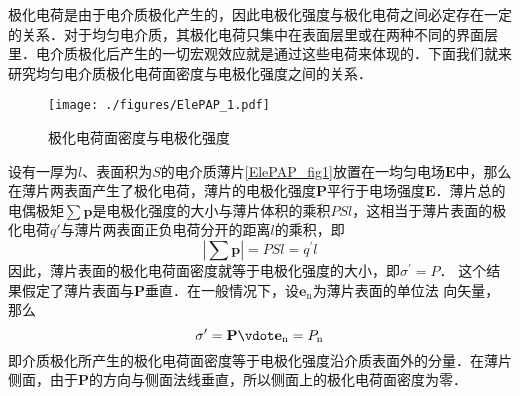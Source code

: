 

极化电荷是由于电介质极化产生的，因此电极化强度与极化电荷之间必定存在一定的关系．对于均匀电介质，其极化电荷只集中在表面层里或在两种不同的界面层里．电介质极化后产生的一切宏观效应就是通过这些电荷来体现的．下面我们就来研究均匀电介质极化电荷面密度与电极化强度之间的关系．

\begin{figure}[ht]
\centering
\texttt{[image: ./figures/ElePAP\_1.pdf]}
\caption{极化电荷面密度与电极化强度} \label{ElePAP_fig1}
\end{figure}
设有一厚为$l$、表面积为$S $的电介质薄片\autoref{ElePAP_fig1}放置在一均匀电场$\mathbf E $中，那么在薄片两表面产生了极化电荷，薄片的电极化强度$\mathbf P $平行于电场强度$\mathbf E$．薄片总的电偶极矩$\sum \mathbf p$是电极化强度的大小与薄片体积的乘积$PSl$，这相当于薄片表面的极化电荷$q' $与薄片两表面正负电荷分开的距离$l $的乘积，即
\begin{equation}
\left|\sum \mathbf p\right|=P S l=q^{\prime} l
\end{equation}
因此，薄片表面的极化电荷面密度就等于电极化强度的大小，即$\sigma^{\prime}=P$．
这个结果假定了薄片表面与$\mathbf P $垂直．在一般情况下，设$\mathbf e_\mathrm{n} $为薄片表面的单位法
向矢量，那么
\begin{equation}
\sigma^{\prime}=\mathbf P \vdot \mathbf e_{\mathrm{n}}=P_{\mathrm{n}}
\end{equation}
即介质极化所产生的极化电荷面密度等于电极化强度沿介质表面外的分量．在薄片侧面，由于$\mathbf P $的方向与侧面法线垂直，所以侧面上的极化电荷面密度为零．